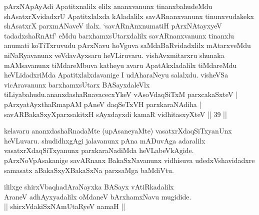 \begin{shl}
{pArxNApAyAdi Apatitxnalilx elilx ananxvanunx tinanxbahudeMdu shAsatxrXvidadxrU Apatitxlalxda kAladalilx savARnanxvanunx tinunxvudakekx shAsatxrX parxmANaveV ilalx. `savARnAnxnumatiH pArxNAtayxyeV tadadxshaRnAtf' eMdu barxhamxsUtarxdalilx savARnanxvanunx tinanxlu anumati koTiTxruvudu pArxNavu hoVguva saMdaBaRvidadxlilx mAtarxveMdu niNaRyavanunx veVdavAyxsaru heVLiruvaru. vishAvxmitarxru shunaka mAMsavanunx tiMdareMbuva katheyu avaru ApatAkxladalilx tiMdareMdu heVLidadxriMda Apatitxlalxdavanige I udAharaNeyu salalxdu. visheVSa vicAravanunx barxhamxsUtarx BASayxdaleVlx tiLiyabahudu.}ananxdashaRnavacecxYkeV vAsoVdaqSiTxM parxcakaSxteV | \\
pArxyatAyxthaRmapAM pAneV daqSeTxVH parxkaraNAdiha | \\
savARBakaSxyXparxsakitxH sAyxdayxdi kamaR vidhitasxyXteV \hfill|| 39 || 
\end{shl}

\begin{artha}
kelavaru ananxdashaRnadaMte (upAsaneyaMte) vasatxrXdaqSiTxyanUnx 
heVLuvaru. shudidhxgAgi jalavanunx pAna mADuvAga adaralilx 
vasatxrXdaqSiTxyanunx parxkaraNadiMda heVLabeVkAgide. 
pArxNoVpAsakanige savARnanx BakaSxNavanunx vidhisuva udedxVshavidadxre 
samasatx aBakaSxyXBakaSxNa parxsaMga baMdiVtu.
\end{artha}

\begin{center}
ililxge shirxVbaqhadAraNayxka BASayx vAtiRkadalilx\\
AraneV adhAyxyadalilx oMdaneV bArxhamxNavu mugidide.\\
|| shirxVdakiSxNAmUtaRyeV namaH ||
\end{center}
